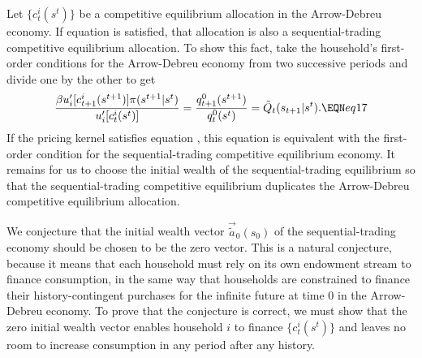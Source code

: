 Let
$\{c_t^i(s^t)\}$ be a competitive equilibrium allocation
in the Arrow-Debreu economy.
If equation  is satisfied, that allocation is also a
sequential-trading competitive equilibrium allocation.  To show this fact,
take the household's first-order conditions  for the Arrow-Debreu
economy from two successive periods and divide one by
the other to get
$$ {\beta u'_i[c_{t+1}^i(s^{t+1})] \pi(s^{t+1} | s^t) \over
       u'_i[c_t^i(s^t)]} = {q^0_{t+1}(s^{t+1}) \over q_t^0(s^t) }
   = \tilde Q_t(s_{t+1}\vert s^t).  \EQN eq17 $$
If the pricing kernel satisfies equation , this equation
is equivalent with the first-order condition  for the sequential-trading
competitive equilibrium economy. It remains for us
to choose the initial wealth of the sequential-trading equilibrium so
that the sequential-trading competitive equilibrium duplicates the
Arrow-Debreu competitive equilibrium allocation.


We conjecture that the initial wealth vector
$\vec {\tilde a}_0(s_0)$ of the sequential-trading economy should be chosen
to be the zero vector. This is a natural conjecture, because
it means that each household must rely on its own
endowment stream to finance consumption, in the same way that households are
constrained to finance their history-contingent purchases
for the infinite future at time $0$ in the Arrow-Debreu economy.
To prove that the conjecture is correct, we must show that the zero
initial wealth vector enables household $i$ to finance $\{c^i_t(s^t)\}$
and leaves no room to increase consumption in any period
 after any history.


